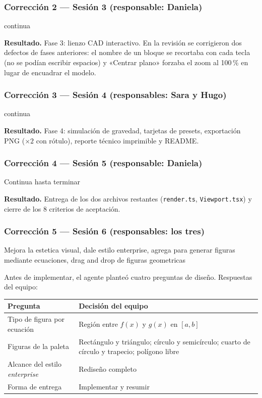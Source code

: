 \documentclass[11pt,a4paper]{article}
\begin{document}
\subsubsection*{Corrección 2 — Sesión 3 (responsable: Daniela)}
\begin{Prompt}
continua
\end{Prompt}
\textbf{Resultado.} Fase 3: lienzo CAD interactivo. En la revisión se corrigieron dos defectos de fases
anteriores: el nombre de un bloque se recortaba con cada tecla (no se podían escribir espacios) y
«Centrar plano» forzaba el zoom al 100\,\% en lugar de encuadrar el modelo.

\subsubsection*{Corrección 3 — Sesión 4 (responsables: Sara y Hugo)}
\begin{Prompt}
continua
\end{Prompt}
\textbf{Resultado.} Fase 4: simulación de gravedad, tarjetas de presets, exportación PNG ($\times 2$ con
rótulo), reporte técnico imprimible y README.

\subsubsection*{Corrección 4 — Sesión 5 (responsable: Daniela)}
\begin{Prompt}
Continua hasta terminar
\end{Prompt}
\textbf{Resultado.} Entrega de los dos archivos restantes (\texttt{render.ts}, \texttt{Viewport.tsx}) y
cierre de los 8 criterios de aceptación.

\subsubsection*{Corrección 5 — Sesión 6 (responsables: los tres)}
\begin{Prompt}
Mejora la estetica visual, dale estilo enterprise, agrega para generar figuras mediante ecuaciones, drag and drop de figuras geometricas
\end{Prompt}
Antes de implementar, el agente planteó cuatro preguntas de diseño. Respuestas del equipo:

\begin{center}
\small
\begin{tabularx}{\textwidth}{L{5.2cm}Y}
\toprule
\textbf{Pregunta} & \textbf{Decisión del equipo}\\
\midrule
Tipo de figura por ecuación & Región entre $f(x)$ y $g(x)$ en $[a,b]$\\
Figuras de la paleta & Rectángulo y triángulo; círculo y semicírculo; cuarto de círculo y trapecio; polígono libre\\
Alcance del estilo \emph{enterprise} & Rediseño completo\\
Forma de entrega & Implementar y resumir\\
\bottomrule
\end{tabularx}
\end{center}
\end{document}
